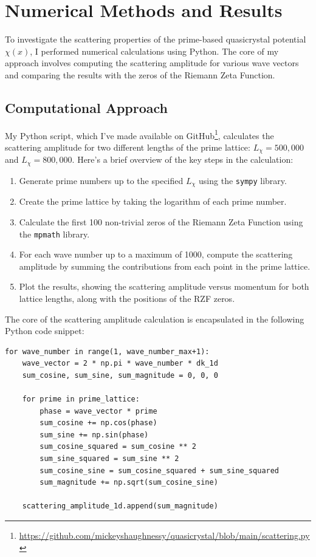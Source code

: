 \documentclass[11pt, oneside]{article}
\begin{document}
\section{Numerical Methods and Results}

To investigate the scattering properties of the prime-based quasicrystal potential $\chi(x)$, I performed numerical calculations using Python. The core of my approach involves computing the scattering amplitude for various wave vectors and comparing the results with the zeros of the Riemann Zeta Function.

\subsection{Computational Approach}

My Python script, which I've made available on GitHub\footnote{\url{https://github.com/mickeyshaughnessy/quasicrystal/blob/main/scattering.py}}, calculates the scattering amplitude for two different lengths of the prime lattice: $L_\chi = 500,000$ and $L_\chi = 800,000$. Here's a brief overview of the key steps in the calculation:

\begin{enumerate}
    \item Generate prime numbers up to the specified $L_\chi$ using the \texttt{sympy} library.
    \item Create the prime lattice by taking the logarithm of each prime number.
    \item Calculate the first 100 non-trivial zeros of the Riemann Zeta Function using the \texttt{mpmath} library.
    \item For each wave number up to a maximum of 1000, compute the scattering amplitude by summing the contributions from each point in the prime lattice.
    \item Plot the results, showing the scattering amplitude versus momentum for both lattice lengths, along with the positions of the RZF zeros.
\end{enumerate}

The core of the scattering amplitude calculation is encapsulated in the following Python code snippet:

\begin{verbatim}
for wave_number in range(1, wave_number_max+1):
    wave_vector = 2 * np.pi * wave_number * dk_1d
    sum_cosine, sum_sine, sum_magnitude = 0, 0, 0

    for prime in prime_lattice:
        phase = wave_vector * prime
        sum_cosine += np.cos(phase)
        sum_sine += np.sin(phase)
        sum_cosine_squared = sum_cosine ** 2
        sum_sine_squared = sum_sine ** 2
        sum_cosine_sine = sum_cosine_squared + sum_sine_squared
        sum_magnitude += np.sqrt(sum_cosine_sine)

    scattering_amplitude_1d.append(sum_magnitude)
\end{verbatim}
\end{document}
